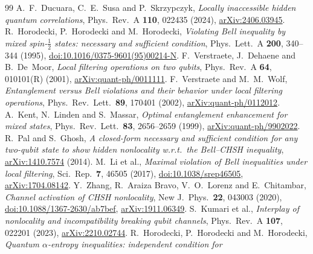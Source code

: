 \documentclass[11pt,a4paper]{article}
\theoremstyle{remark}\newtheorem{remark}[theorem]{Remark}
\begin{document}
\appendix



\begin{thebibliography}{99}
 A.~F.~Ducuara, C.~E.~Susa and P.~Skrzypczyk,
\emph{Locally inaccessible hidden quantum correlations}, Phys.\ Rev.\ A
\textbf{110}, 022435 (2024),
\href{https://arxiv.org/abs/2406.03945}{arXiv:2406.03945}.
 R.~Horodecki, P.~Horodecki and M.~Horodecki,
\emph{Violating Bell inequality by mixed spin-$\frac12$ states: necessary
and sufficient condition}, Phys.\ Lett.\ A \textbf{200}, 340--344 (1995),
\href{https://doi.org/10.1016/0375-9601(95)00214-N}{doi:10.1016/0375-9601(95)00214-N}.
 F.~Verstraete, J.~Dehaene and B.~De~Moor,
\emph{Local filtering operations on two qubits}, Phys.\ Rev.\ A \textbf{64},
010101(R) (2001),
\href{https://arxiv.org/abs/quant-ph/0011111}{arXiv:quant-ph/0011111}.
 F.~Verstraete and M.~M.~Wolf,
\emph{Entanglement versus Bell violations and their behavior under local
filtering operations}, Phys.\ Rev.\ Lett.\ \textbf{89}, 170401 (2002),
\href{https://arxiv.org/abs/quant-ph/0112012}{arXiv:quant-ph/0112012}.
 A.~Kent, N.~Linden and S.~Massar,
\emph{Optimal entanglement enhancement for mixed states}, Phys.\ Rev.\
Lett.\ \textbf{83}, 2656--2659 (1999),
\href{https://arxiv.org/abs/quant-ph/9902022}{arXiv:quant-ph/9902022}.
\bibitem{palghosh} R.~Pal and S.~Ghosh,
\emph{A closed-form necessary and sufficient condition for any two-qubit
state to show hidden nonlocality w.r.t.\ the Bell--CHSH inequality},
\href{https://arxiv.org/abs/1410.7574}{arXiv:1410.7574} (2014).
 M.~Li et al.,
\emph{Maximal violation of Bell inequalities under local filtering},
Sci.\ Rep.\ \textbf{7}, 46505 (2017),
\href{https://doi.org/10.1038/srep46505}{doi:10.1038/srep46505},
\href{https://arxiv.org/abs/1704.08142}{arXiv:1704.08142}.
 Y.~Zhang, R.~Araiza Bravo, V.~O.~Lorenz and E.~Chitambar,
\emph{Channel activation of CHSH nonlocality}, New J.\ Phys.\ \textbf{22},
043003 (2020),
\href{https://doi.org/10.1088/1367-2630/ab7bef}{doi:10.1088/1367-2630/ab7bef},
\href{https://arxiv.org/abs/1911.06349}{arXiv:1911.06349}.
 S.~Kumari et al.,
\emph{Interplay of nonlocality and incompatibility breaking qubit channels},
Phys.\ Rev.\ A \textbf{107}, 022201 (2023),
\href{https://arxiv.org/abs/2210.02744}{arXiv:2210.02744}.
 R.~Horodecki, P.~Horodecki and M.~Horodecki,
\emph{Quantum $\alpha$-entropy inequalities: independent condition for
}
\end{thebibliography}
\end{document}
